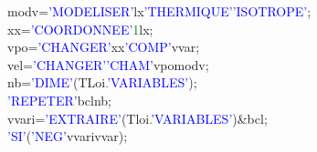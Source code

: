 modv\hspace*{1em}=\hspace*{1em}\textcolor{blue}{'MODELISER'}\hspace*{1em}lx\hspace*{1em}\textcolor{blue}{'THERMIQUE'}\hspace*{1em}\textcolor{blue}{'ISOTROPE'};\\
xx\hspace*{1em}=\hspace*{1em}\textcolor{blue}{'COORDONNEE'}\hspace*{1em}\textcolor{green}{1}\hspace*{1em}lx\hspace*{1em};\\
vpo\hspace*{1em}=\hspace*{1em}\textcolor{blue}{'CHANGER'}\hspace*{1em}xx\hspace*{1em}\textcolor{blue}{'COMP'}\hspace*{1em}vvar;\\
vel\hspace*{1em}=\hspace*{1em}\textcolor{blue}{'CHANGER'}\hspace*{1em}\textcolor{blue}{'CHAM'}\hspace*{1em}vpo\hspace*{1em}modv\hspace*{1em};\\
nb\hspace*{1em}\hspace*{1em}=\hspace*{1em}\textcolor{blue}{'DIME'}\hspace*{1em}(TLoi\textcolor{green}{.}\textcolor{blue}{'VARIABLES'});\\
\textcolor{blue}{'REPETER'}\hspace*{1em}bcl\hspace*{1em}nb;\\
\hspace*{1em}\hspace*{1em}\hspace*{1em}vvari\hspace*{1em}=\hspace*{1em}\textcolor{blue}{'EXTRAIRE'}\hspace*{1em}(Tloi\textcolor{green}{.}\textcolor{blue}{'VARIABLES'})\hspace*{1em}\&bcl;\\
\hspace*{1em}\hspace*{1em}\hspace*{1em}\textcolor{blue}{'SI'}(\textcolor{blue}{'NEG'}\hspace*{1em}vvari\hspace*{1em}vvar);\\
